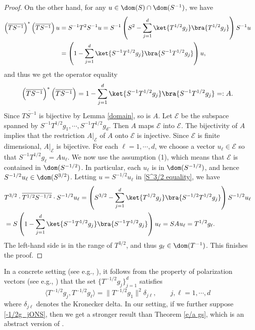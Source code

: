 \documentclass[12pt,draft]{article}
\theoremstyle{plain}
\numberwithin{equation}{section}
\theoremstyle{remark}
\begin{document}
\begin{proof}
On the other hand, for any $u\in\dom(S)\cap\dom(S^{-1})$, we have
\begin{align*}
\left(\overline{TS^{-1}}\right)^*\left(\overline{TS^{-1}}\right)u 
&= S^{-1}T^2S^{-1}u = S^{-1}\left(S^{2}-\sum_{j=1}^d\ket{T^{1/2}g_j}\bra{T^{1/2}g_j}\right)S^{-1}u\\
&= \left(1-\sum_{j=1}^d\ket{S^{-1}T^{1/2}g_j}\bra{S^{-1}T^{1/2}g_j}\right)u,
\end{align*}
and thus we get the operator equality
\begin{equation*}
\left(\overline{TS^{-1}}\right)^*\left(\overline{TS^{-1}}\right) = 1-\sum_{j=1}^d\ket{S^{-1}T^{1/2}g_j}\bra{S^{-1}T^{1/2}g_j}=:A.
\end{equation*}
Since $\overline{TS^{-1}}$ is bijective by Lemma \ref{domain}, so is $A$.
Let $\mathscr{E}$ be the subspace spanned by $S^{-1}T^{1/2}g_1,\cdots,S^{-1}T^{1/2}g_d$.
Then $A$ maps $\mathscr{E}$ into $\mathscr{E}$.
The bijectivity of $A$ implies that the restriction $A|_{\mathscr{E}}$ of $A$ onto $\mathscr{E}$ is injective.
Since $\mathscr{E}$ is finite dimensional, $A|_{\mathscr{E}}$ is bijective.
For each $\ell=1,\cdots,d$, we choose a vector $u_\ell\in\mathscr{E}$ so that $S^{-1}T^{1/2}g_\ell=Au_\ell$.
We now use the assumption (1), which means that $\mathscr{E}$ is contained in $\dom(S^{-1/2})$. 
In particular, each $u_\ell$ is in $\dom(S^{-1/2})$, and hence $S^{-1/2}u_\ell\in\dom(S^{3/2})$.
Letting $u=S^{-1/2}u_\ell$ in \eqref{S^3/2 equality}, we have
\begin{align*}
&T^{3/2}\cdot\overline{T^{1/2}S^{-1/2}}\cdot S^{-1/2}u_\ell
= \left(S^{3/2}-\sum_{j=1}^d\ket{T^{1/2}g_j}\bra{S^{-1/2}T^{1/2}g_j}\right)S^{-1/2}u_\ell\\
&=S\left(1-\sum_{j=1}^d\ket{S^{-1}T^{1/2}g_j}\bra{S^{-1}T^{1/2}g_j}\right)u_\ell
=SAu_\ell =T^{1/2}g_\ell.
\end{align*}
The left-hand side is in the range of $T^{3/2}$, and thus $g_\ell\in\dom(T^{-1})$.
This finishes the proof.
\end{proof}


In a concrete setting (see e.g., \cite{A83b}), it follows from the property of polarization vectors (see e.g., \cite[equality (11.26)]{A18}) 
that the set $\{T^{-1/2}g_j\}_{j=1}^d$ satisfies
\begin{equation}\label{-1/2g_jONS}
\langle T^{-1/2}g_j,T^{-1/2}g_\ell\rangle =\|T^{-1/2}g_1\|^2\delta_{j\ell},\qquad j,\ell=1,\cdots,d
\end{equation}
where $\delta_{j\ell}$ denotes the Kronecker delta.
In our setting, if we further suppose \eqref{-1/2g_jONS}, then we get a stronger result than Theorem \ref{e/a gs}, which is an abstract version of \cite[Theorem 3.3]{A83b}.
\end{document}
